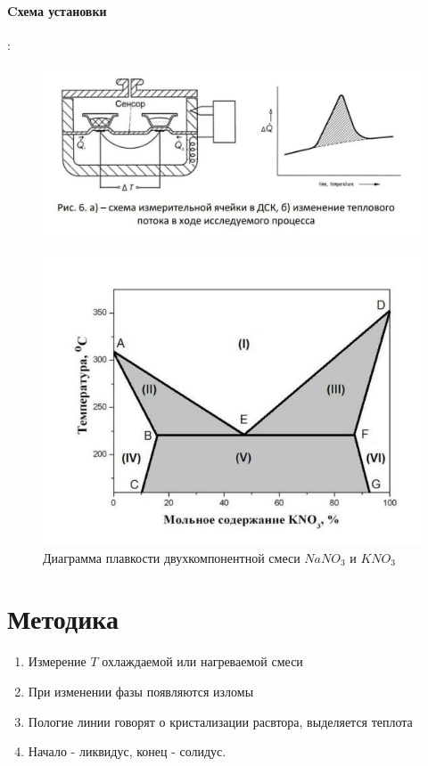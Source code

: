\documentclass[a4paper,12pt]{article} %
\begin{document}
\paragraph{Cхема установки}:
\begin{figure}[H]
    \centering
    \includegraphics[width = 100 mm]{gr_4.jpg}
\end{figure}
\begin{figure}[H]
    \centering
    \includegraphics[width = 180 mm]{gr_1.jpg}
    \caption{Диаграмма плавкости двухкомпонентной смеси $NaNO_3$ и $KNO_3$}
\end{figure}
\section{Методика}
\begin{enumerate}
    \item Измерение $T$ охлаждаемой или нагреваемой смеси
    \item При изменении фазы появляются изломы
    \item Пологие линии говорят о кристализации расвтора, выделяется теплота
    \item Начало - ликвидус, конец - солидус.
\end{enumerate}
\end{document}
